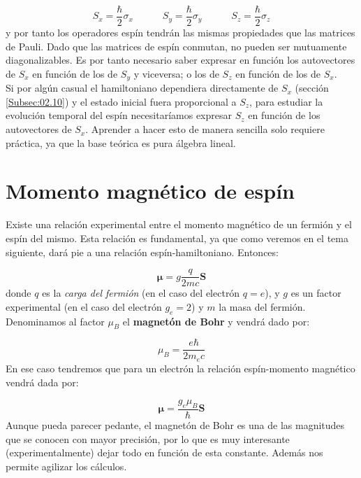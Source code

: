 \documentclass[12pt]{book}
\numberwithin{equation}{chapter}
\numberwithin{figure}{chapter}
\newcommand{\tquad}{\quad \quad \quad}
\newcommand{\Sn}{\mathbf{S}}
\newcommand{\mun}{\boldsymbol{\mu}}
\begin{document}
\begin{equation}
S_x = \frac{\hbar}{2} \sigma_x \tquad 
S_y = \frac{\hbar}{2} \sigma_y \tquad
S_z = \frac{\hbar}{2} \sigma_z
\end{equation}
y por tanto los operadores espín tendrán las mismas propiedades que las matrices de Pauli. Dado que las matrices de espín conmutan, no pueden ser mutuamente diagonalizables. Es por tanto necesario saber expresar en función los autovectores de $S_x$ en función de los de $S_y$ y viceversa; o los de $S_z$ en función de los de $S_x$. \\

Si por algún casual el hamiltoniano dependiera directamente de $S_x$ (sección \ref{Subsec:02.10}) y el estado inicial fuera proporcional a $S_z$, para estudiar la evolución temporal del espín necesitaríamos expresar $S_z$ en función de los autovectores de $S_x$. Aprender a hacer esto de manera sencilla solo requiere práctica, ya que la base teórica es pura álgebra lineal.  \\


\section{Momento magnético de espín}

Existe una relación experimental entre el momento magnético de un fermión y el espín del mismo. Esta relación es fundamental, ya que como veremos en el tema siguiente, dará pie a una relación espín-hamiltoniano. Entonces:

\begin{equation}
\mun = g \dfrac{q}{2 m c} \Sn
\end{equation}
donde $q$ es la \textit{carga del fermión} (en el caso del electrón $q=e$), y $g$ es un factor experimental (en el caso del electrón $g_e=2$) y $m$ la masa del fermión. Denominamos al factor $\mu_B$ el \textbf{magnetón de Bohr} y vendrá dado por:

\begin{equation}
\mu_B = \frac{e \hbar}{2 m_e c}
\end{equation}
En ese caso tendremos que para un electrón la relación espín-momento magnético vendrá dada por:

\begin{equation}
\mun = \frac{g_e \mu_B}{\hbar} \Sn
\end{equation}
Aunque pueda parecer pedante, el magnetón de Bohr es una de las magnitudes que se conocen con mayor precisión, por lo que es muy interesante (experimentalmente) dejar todo en función de esta constante. Además nos permite agilizar los cálculos. \\
\end{document}
